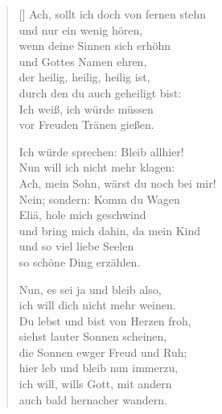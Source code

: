 \begin{multicols}{2}
\begin{verse}[\versewidth]
 Ach, sollt ich doch von fernen stehn\\
und nur ein wenig hören,\\
wenn deine Sinnen sich erhöhn\\
und Gottes Namen ehren,\\
der heilig, heilig, heilig ist,\\
durch den du auch geheiligt bist:\\
Ich weiß, ich würde müssen\\
vor Freuden Tränen gießen.

 Ich würde sprechen: Bleib allhier!\\
Nun will ich nicht mehr klagen:\\
Ach, mein Sohn, wärst du noch bei mir!\\
Nein; sondern: Komm du Wagen\\
Eliä, hole mich geschwind\\
und bring mich dahin, da mein Kind\\
und so viel liebe Seelen\\
so schöne Ding erzählen.

 Nun, es sei ja und bleib also,\\
ich will dich nicht mehr weinen.\\
Du lebst und bist von Herzen froh,\\
siehst lauter Sonnen scheinen,\\
die Sonnen ewger Freud und Ruh;\\
hier leb und bleib nun immerzu,\\
ich will, wills Gott, mit andern\\
auch bald hernacher wandern.

\end{verse}
\end{multicols}

